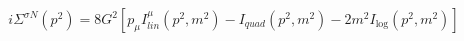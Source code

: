 \begin{equation}
i\Sigma ^{\sigma N}(p^{2})=8G^{2}[p_{\mu }I_{lin}^{\mu
}(p^{2},m^{2})-I_{quad}(p^{2},m^{2})-2m^{2}I_{\log }(p^{2},m^{2})]
\end{equation}

